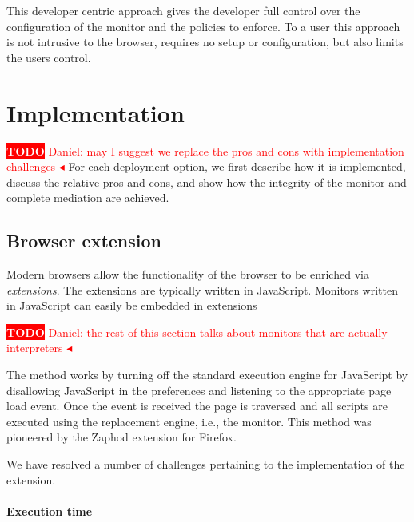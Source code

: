 \documentclass{llncs}
\newcommand{\todo}[1]{\colorbox{red}{\textcolor{white}{\sffamily\bfseries\scriptsize TODO}} \textcolor{red}{#1} \textcolor{red}{$\blacktriangleleft$}}
\begin{document}
This developer centric approach gives the developer full control over the 
configuration of the monitor and the policies to enforce. To a user this 
approach is not intrusive to the browser, requires no setup or configuration, 
but also limits the users control. 


\section{Implementation}
\label{sec:impl}

\todo{Daniel: may I suggest we replace the pros and cons with implementation challenges}
For each deployment option, we first describe how it is implemented,
discuss the relative pros and cons, and show how the integrity of the monitor
and complete mediation are achieved.


\subsection{Browser extension}

Modern browsers allow the functionality of the browser to be enriched via
\emph{extensions}. The extensions are typically written in JavaScript.  
Monitors written in JavaScript can easily be embedded in extensions

\todo{Daniel: the rest of this section talks about monitors that are actually interpreters}

The method works by turning off the standard execution engine for JavaScript
by disallowing JavaScript in the preferences and listening to the appropriate
page load event. Once the event is received the page is traversed and all
scripts are executed using the replacement engine, i.e., the monitor. This
method was pioneered by the Zaphod \cite{Zaphod} extension for Firefox.

We have resolved a number of challenges pertaining to the implementation of the
extension.

\paragraph{Execution time}
\end{document}
